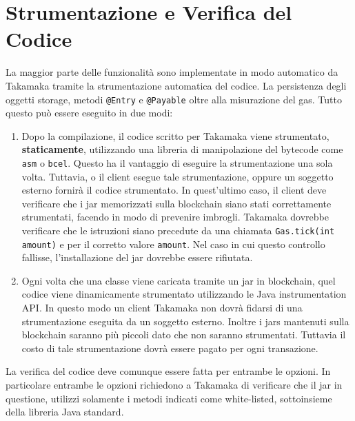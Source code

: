 \section{Strumentazione e Verifica del Codice} \label{takamaka:strumentazione-e-verifica-del-codice}
La maggior parte delle funzionalità sono implementate in modo automatico da Takamaka tramite la strumentazione automatica del codice. La persistenza degli oggetti storage, metodi \lstinline|@Entry| e \lstinline|@Payable| oltre alla misurazione del gas. Tutto questo può essere eseguito in due modi:
\begin{enumerate}
	\item Dopo la compilazione, il codice scritto per Takamaka viene strumentato, \textbf{staticamente}, utilizzando una libreria di manipolazione del bytecode come \lstinline|asm| o \lstinline|bcel|. Questo ha il vantaggio di eseguire la strumentazione una sola volta. Tuttavia, o il client esegue tale strumentazione, oppure un soggetto esterno fornirà il codice strumentato. In quest'ultimo caso, il client deve verificare che i jar memorizzati sulla blockchain siano stati correttamente strumentati, facendo in modo di prevenire imbrogli. Takamaka dovrebbe verificare che le istruzioni siano precedute da una chiamata \lstinline|Gas.tick(int amount)| e per il corretto valore \lstinline|amount|. Nel caso in cui questo controllo fallisse, l'installazione del jar dovrebbe essere rifiutata.
	\item Ogni volta che una classe viene caricata tramite un jar in blockchain, quel codice viene dinamicamente strumentato utilizzando le Java instrumentation API. In questo modo un client Takamaka non dovrà fidarsi di una strumentazione eseguita da un soggetto esterno. Inoltre i jars mantenuti sulla blockchain saranno più piccoli dato che non saranno strumentati. Tuttavia il costo di tale strumentazione dovrà essere pagato per ogni transazione.
\end{enumerate}
%
La verifica del codice deve comunque essere fatta per entrambe le opzioni. In particolare entrambe le opzioni richiedono a Takamaka di verificare che il jar in questione, utilizzi solamente i metodi indicati come white-listed, sottoinsieme della libreria Java standard.

